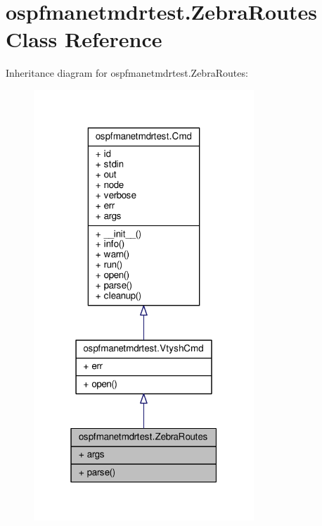 \hypertarget{classospfmanetmdrtest_1_1_zebra_routes}{\section{ospfmanetmdrtest.\+Zebra\+Routes Class Reference}
\label{classospfmanetmdrtest_1_1_zebra_routes}
}


Inheritance diagram for ospfmanetmdrtest.\+Zebra\+Routes\+:
\nopagebreak
\begin{figure}[H]
\begin{center}
\leavevmode
\includegraphics[width=235pt]{classospfmanetmdrtest_1_1_zebra_routes__inherit__graph}
\end{center}
\end{figure}



